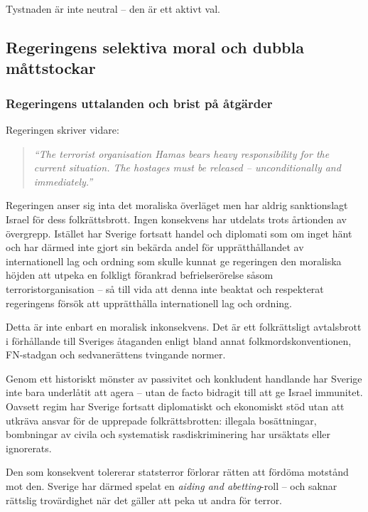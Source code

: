 \documentclass[12pt]{article}
\begin{document}
Tystnaden är inte neutral – den är ett aktivt val.



\subsection*{Regeringens selektiva moral och dubbla måttstockar}

\subsubsection*{Regeringens uttalanden och brist på åtgärder}

Regeringen skriver vidare:

\begin{quote}
\textit{“The terrorist organisation Hamas bears heavy responsibility for the current situation. The hostages must be released – unconditionally and immediately.”}
\end{quote}

Regeringen anser sig inta det moraliska överläget men har aldrig sanktionslagt Israel för dess folkrättsbrott. Ingen konsekvens har utdelats trots årtionden av övergrepp. Istället har Sverige fortsatt handel och diplomati som om inget hänt och har därmed inte gjort sin bekärda andel för upprätthållandet av internationell lag och ordning som skulle kunnat ge regeringen den moraliska höjden att utpeka en folkligt förankrad befrielserörelse såsom terroristorganisation – så till vida att denna inte beaktat och respekterat regeringens försök att upprätthålla internationell lag och ordning.

Detta är inte enbart en moralisk inkonsekvens. Det är ett folkrättsligt avtalsbrott i förhållande till Sveriges åtaganden enligt bland annat folkmordskonventionen, FN-stadgan och sedvanerättens tvingande normer.

Genom ett historiskt mönster av passivitet och konkludent handlande har Sverige inte bara underlåtit att agera – utan de facto bidragit till att ge Israel immunitet. Oavsett regim har Sverige fortsatt diplomatiskt och ekonomiskt stöd utan att utkräva ansvar för de upprepade folkrättsbrotten: illegala bosättningar, bombningar av civila och systematisk rasdiskriminering har ursäktats eller ignorerats.

Den som konsekvent tolererar statsterror förlorar rätten att fördöma motstånd mot den. Sverige har därmed spelat en \textit{aiding and abetting}-roll – och saknar rättslig trovärdighet när det gäller att peka ut andra för terror.
\end{document}
